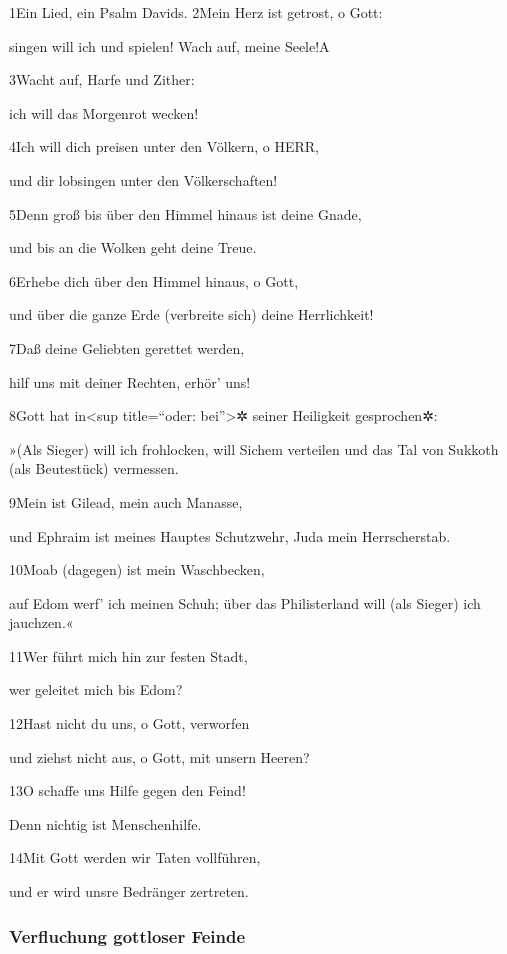 1Ein Lied, ein Psalm Davids. 2Mein Herz ist getrost, o Gott:

singen will ich und spielen! Wach auf, meine Seele!{A}

3Wacht auf, Harfe und Zither:

ich will das Morgenrot wecken!

4Ich will dich preisen unter den Völkern, o HERR,

und dir lobsingen unter den Völkerschaften!

5Denn groß bis über den Himmel hinaus ist deine Gnade,

und bis an die Wolken geht deine Treue.

6Erhebe dich über den Himmel hinaus, o Gott,

und über die ganze Erde (verbreite sich) deine Herrlichkeit!

7Daß deine Geliebten gerettet werden,

hilf uns mit deiner Rechten, erhör' uns!

8Gott hat in\textless sup title=``oder: bei''\textgreater✲ seiner
Heiligkeit gesprochen✲:

»(Als Sieger) will ich frohlocken, will Sichem verteilen und das Tal von
Sukkoth (als Beutestück) vermessen.

9Mein ist Gilead, mein auch Manasse,

und Ephraim ist meines Hauptes Schutzwehr, Juda mein Herrscherstab.

10Moab (dagegen) ist mein Waschbecken,

auf Edom werf' ich meinen Schuh; über das Philisterland will (als
Sieger) ich jauchzen.«

11Wer führt mich hin zur festen Stadt,

wer geleitet mich bis Edom?

12Hast nicht du uns, o Gott, verworfen

und ziehst nicht aus, o Gott, mit unsern Heeren?

13O schaffe uns Hilfe gegen den Feind!

Denn nichtig ist Menschenhilfe.

14Mit Gott werden wir Taten vollführen,

und er wird unsre Bedränger zertreten.

\hypertarget{verfluchung-gottloser-feinde}{%
\subsubsection{Verfluchung gottloser
Feinde}\label{verfluchung-gottloser-feinde}}


